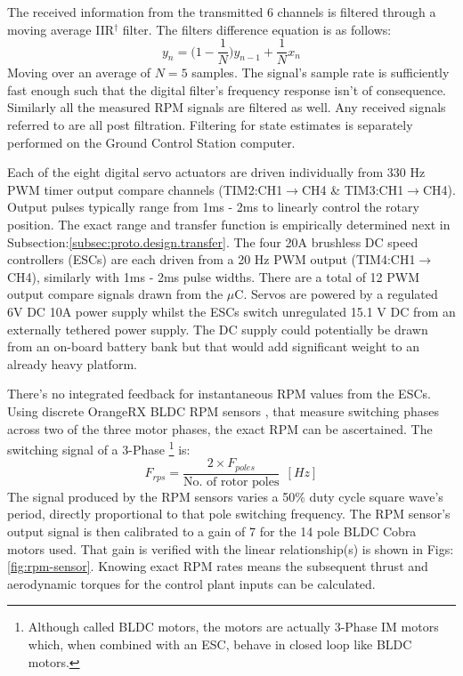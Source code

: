 \par
{\color{red}
The received information from the transmitted 6 channels is filtered through a moving average IIR$^\dagger$ filter. The filters difference equation is as follows: 
\begin{equation}
y_n = \big(1-\frac{1}{N}\big)y_{n-1}+\frac{1}{N}x_n
\end{equation}
Moving over an average of $N=5$ samples. The signal's sample rate is sufficiently fast enough such that the digital filter's frequency response isn't of consequence. Similarly all the measured RPM signals are filtered as well. Any received signals referred to are all post filtration. Filtering for state estimates is separately performed on the Ground Control Station computer.}
\par
Each of the eight digital servo actuators are driven individually from 330 Hz PWM timer output compare channels (TIM2:CH1$\rightarrow$CH4 \& TIM3:CH1$\rightarrow$CH4). Output pulses typically range from 1ms - 2ms to linearly control the rotary position. The exact range and transfer function is empirically determined next in Subsection:\ref{subsec:proto.design.transfer}. The four 20A brushless DC speed controllers (ESCs) are each driven from a 20 Hz PWM output (TIM4:CH1$\rightarrow$CH4), similarly with 1ms - 2ms pulse widths. There are a total of 12 PWM output compare signals drawn from the $\mu$C. Servos are powered by a regulated 6V DC 10A power supply \cite{rotorstar} whilst the ESCs switch unregulated 15.1 V DC from an externally tethered power supply. The DC supply could potentially be drawn from an on-board battery bank but that would add significant weight to an already heavy platform.
\par
There's no integrated feedback for instantaneous RPM values from the ESCs. Using discrete OrangeRX BLDC RPM sensors \cite{orangerpm}, that measure switching phases across two of the three motor phases, the exact RPM can be ascertained. The switching signal of a 3-Phase \footnote{Although called BLDC motors, the motors are actually 3-Phase IM motors which, when combined with an ESC, behave in closed loop like BLDC motors.} is\cite{.}:
\begin{equation}
F_{rps}=\frac{2\times F_{poles}}{\text{No. of rotor poles}}~~[Hz]
\end{equation}
The signal produced by the RPM sensors varies a 50\% duty cycle square wave's period, directly proportional to that pole switching frequency. The RPM sensor's output signal is then calibrated to a gain of 7 for the 14 pole BLDC Cobra motors used. That gain is verified with the linear relationship(s) is shown in Figs:\ref{fig:rpm-sensor}. Knowing exact RPM rates means the subsequent thrust and aerodynamic torques for the control plant inputs can be calculated.
